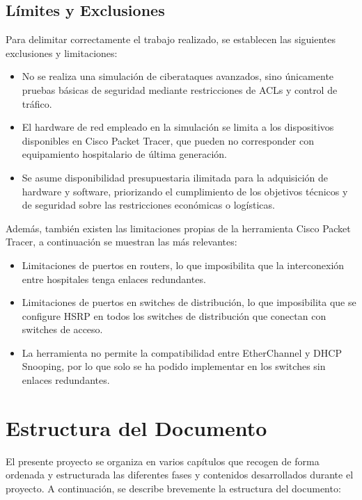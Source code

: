\subsection{Límites y Exclusiones}
\label{subsec:limites}
Para delimitar correctamente el trabajo realizado, se establecen las siguientes exclusiones y limitaciones:
\begin{itemize}
    \item No se realiza una simulación de ciberataques avanzados, sino únicamente pruebas básicas de seguridad mediante restricciones de ACLs y control de tráfico.
    \item El hardware de red empleado en la simulación se limita a los dispositivos disponibles en Cisco Packet Tracer, que pueden no corresponder con equipamiento 
    hospitalario de última generación.
    \item Se asume disponibilidad presupuestaria ilimitada para la adquisición de hardware y software, priorizando el cumplimiento de los objetivos técnicos y de 
    seguridad sobre las restricciones económicas o logísticas.
\end{itemize}
Además, también existen las limitaciones propias de la herramienta Cisco Packet Tracer, a continuación se muestran las más relevantes:
\begin{itemize}
    \item Limitaciones de puertos en routers, lo que imposibilita que la interconexión entre hospitales tenga enlaces redundantes.
    \item Limitaciones de puertos en switches de distribución, lo que imposibilita que se configure HSRP en todos los switches de distribución que conectan con switches de acceso.
    \item La herramienta no permite la compatibilidad entre EtherChannel y DHCP Snooping, por lo que solo se ha podido implementar en los switches sin enlaces redundantes.
\end{itemize}

\section{Estructura del Documento}
El presente proyecto se organiza en varios capítulos que recogen de forma ordenada y estructurada las diferentes fases y contenidos desarrollados durante el proyecto. 
A continuación, se describe brevemente la estructura del documento:

